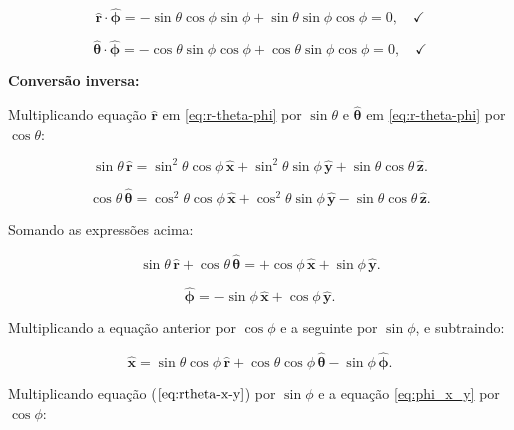 \documentclass[a4paper,12pt]{article}
\begin{document}
\begin{equation}
    \hat{\mathbf{r}} \cdot \hat{\bm{\phi}} = -\sin\theta \cos\phi \sin\phi + \sin\theta \sin\phi \cos\phi = 0, \quad \checkmark
\end{equation}

\begin{equation}
\hat{\bm{\theta}} \cdot \hat{\bm{\phi}} = -\cos\theta \sin\phi \cos\phi + \cos\theta \sin\phi \cos\phi = 0, \quad \checkmark
\end{equation}

\textbf{Conversão inversa:} 

Multiplicando equação $\hat{\mathbf{r}}$ em  \ref{eq:r-theta-phi} por $\sin\theta$ e $\hat{\bm{\theta}}$ em \ref{eq:r-theta-phi} por $\cos\theta$:

\begin{equation}
\sin\theta \, \hat{\mathbf{r}} = \sin^2\theta \cos\phi \, \hat{\mathbf{x}} + \sin^2\theta \sin\phi \, \hat{\mathbf{y}} + \sin\theta \cos\theta \, \hat{\mathbf{z}}.
\end{equation}

\begin{equation}
\cos\theta \, \hat{\bm{\theta}} = \cos^2\theta \cos\phi \, \hat{\mathbf{x}} + \cos^2\theta \sin\phi \, \hat{\mathbf{y}} - \sin\theta \cos\theta \, \hat{\mathbf{z}}.
\end{equation}

Somando as expressões acima:

\begin{equation}\label{eq:rtheta-x-y}
\sin\theta \, \hat{\mathbf{r}} + \cos\theta \, \hat{\bm{\theta}} = +\cos\phi \, \hat{\mathbf{x}} + \sin\phi \, \hat{\mathbf{y}}.
\end{equation}

\begin{equation}\label{eq:phi_x_y}
\hat{\bm{\phi}} = -\sin\phi \, \hat{\mathbf{x}} + \cos\phi \, \hat{\mathbf{y}}.
\end{equation}

Multiplicando a equação anterior por \(\cos\phi\) e a seguinte por \(\sin\phi\), e subtraindo:

\begin{equation}
\hat{\mathbf{x}} = \sin\theta \cos\phi \, \hat{\mathbf{r}} + \cos\theta \cos\phi \, \hat{\bm{\theta}} - \sin\phi \, \hat{\bm{\phi}}.
\end{equation}

Multiplicando equação ($\ref{eq:rtheta-x-y}$) por \(\sin\phi\) e a equação \ref{eq:phi_x_y} por \(\cos\phi\):
\end{document}
